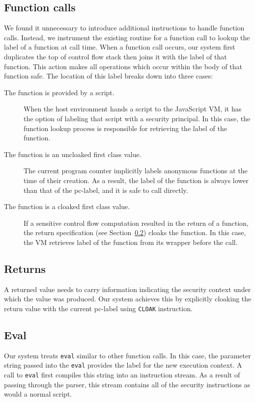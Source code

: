 \subsection{Function calls}
\label{sec:function-calls}
We found it unnecessary to introduce additional instructions to handle function calls.
Instead, we instrument the existing routine for a function call to lookup the label of a function at call time.
When a function call occurs, our system first duplicates the top of control flow stack then joins it with the label of that function.
This action makes all operations which occur within the body of that function safe.
The location of this label breaks down into three cases:
\begin{description}
 \item [The function is provided by a script.]
  When the host environment hands a script to the JavaScript VM, it has the option of labeling that script with a security principal.
  In this case, the function lookup process is responsible for retrieving the label of the function.
 \item [The function is an uncloaked first class value.]
  The current program counter implicitly labels anonymous functions at the time of their creation.
  As a result, the label of the function is always lower than that of the pc-label, and it is safe to call directly.
 \item [The function is a cloaked first class value.]
  If a sensitive control flow computation resulted in the return of a function, the return specification (see Section~\ref{sec:returns}) cloaks the function.
  In this case, the VM retrieves label of the function from its wrapper before the call.
\end{description}

\subsection{Returns}
\label{sec:returns}
A returned value needs to carry information indicating the security context under which the value was produced.
Our system achieves this by explicitly cloaking the return value with the current pc-label using \texttt{CLOAK} instruction.

\subsection{Eval}
\label{sec:eval}
Our system treats \texttt{eval} similar to other function calls.
In this case, the parameter string passed into the \texttt{eval} provides the label for the new execution context.
A call to \texttt{eval} first compiles this string into an instruction stream.
As a result of passing through the parser, this stream contains all of the security instructions as would a normal script.

